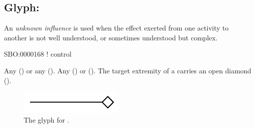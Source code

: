 \subsection{Glyph: }
\label{sec:af:unknown_infl}

An \emph{unknown influence} is used when the effect exerted from one activity to another is not well understood, or sometimes understood but complex.

\begin{glyphDescription}

\glyphSboTerm SBO:0000168 ! control

 \glyphOrigin Any  () or any  ().
 \glyphTarget Any  () or  ().
 \glyphEndPoint The target extremity of a  carries an open diamond ().

\end{glyphDescription}

\begin{figure}[H]
  \centering
  \includegraphics[width = 2in]{images/build/unknownInfluence.pdf}
  \caption{The \AF glyph for .}
  \label{fig:af:unknownInfl}
\end{figure}


